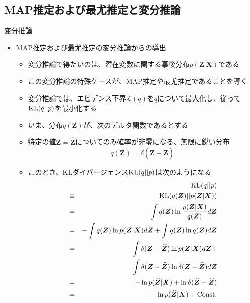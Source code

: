 \documentclass[dvipdfmx,notheorems,t]{beamer}
\begin{document}
\subsection{MAP推定および最尤推定と変分推論}

\begin{frame}{変分推論}

\begin{itemize}
	\item MAP推定および最尤推定の変分推論からの導出
	\begin{itemize}
		\item 変分推論で得たいのは、潜在変数に関する事後分布$p(\bm{Z} | \bm{X})$である
		\item この変分推論の\alert{特殊ケース}が、MAP推定や最尤推定であることを導く
		\newline
		\item 変分推論では、エビデンス下界$\mathcal{L}(q)$を$q$について最大化し、従って\color{red}$\operatorname{KL}(q || p)$を最小化\normalcolor する
		\item いま、分布$q(\bm{Z})$が、次の\alert{デルタ関数}であるとする
		\item 特定の値$\bm{Z} = \widehat{\bm{Z}}$についてのみ確率が非零になる、無限に鋭い分布
		\begin{equation}
			q(\bm{Z}) = \delta(\bm{Z} - \widehat{\bm{Z}})
		\end{equation}
		
		\item このとき、KLダイバージェンス$\operatorname{KL}(q || p)$は次のようになる
		\begin{eqnarray}
			&& \operatorname{KL}(q || p) \nonumber \\
			&\equiv& \operatorname{KL}(q(\bm{Z}) || p(\bm{Z} | \bm{X})) \nonumber \\
			&=& - \int q(\bm{Z}) \ln \frac{p(\bm{Z} | \bm{X})}{q(\bm{Z})} d\bm{Z} \nonumber \\
			&=& - \int q(\bm{Z}) \ln p(\bm{Z} | \bm{X}) d\bm{Z} + \int q(\bm{Z}) \ln q(\bm{Z}) d\bm{Z} \\
			&=& - \int \delta(\bm{Z} - \widehat{\bm{Z}}) \ln p(\bm{Z} | \bm{X}) d\bm{Z} + \nonumber \\
			&& \qquad \int \delta(\bm{Z} - \widehat{\bm{Z}}) \ln \delta(\bm{Z} - \widehat{\bm{Z}}) d\bm{Z} \\
			&=& - \ln p(\widehat{\bm{Z}} | \bm{X}) + \ln \delta(\widehat{\bm{Z}} - \widehat{\bm{Z}}) \\
			&=& - \ln p(\widehat{\bm{Z}} | \bm{X}) + \mathrm{Const.}
		\end{eqnarray}
		

\end{itemize}
\end{itemize}
\end{frame}
\end{document}
